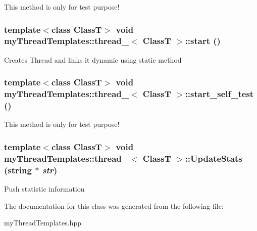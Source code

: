 This method is only for test purpose! 

\hypertarget{classmyThreadTemplates_1_1thread__1_a40dcf528dbb18b16ed44054451a575e1}{
\subsubsection[{start}]{\setlength{\rightskip}{0pt plus 5cm}template$<$class ClassT$>$ void {\bf myThreadTemplates::thread\_}$<$ ClassT $>$::start ()}}
\label{classmyThreadTemplates_1_1thread__1_a40dcf528dbb18b16ed44054451a575e1}


Creates Thread and links it dynamic using static method 

\hypertarget{classmyThreadTemplates_1_1thread__1_aaa171242d5355f2a472a566d30863894}{
\subsubsection[{start\_\-self\_\-test}]{\setlength{\rightskip}{0pt plus 5cm}template$<$class ClassT$>$ void {\bf myThreadTemplates::thread\_}$<$ ClassT $>$::start\_\-self\_\-test ()}}
\label{classmyThreadTemplates_1_1thread__1_aaa171242d5355f2a472a566d30863894}


This method is only for test purpose! 

\hypertarget{classmyThreadTemplates_1_1thread__1_a2cd2286a9d51537395123832a6a25ebc}{
\subsubsection[{UpdateStats}]{\setlength{\rightskip}{0pt plus 5cm}template$<$class ClassT$>$ void {\bf myThreadTemplates::thread\_}$<$ ClassT $>$::UpdateStats (string $\ast$ {\em str})}}
\label{classmyThreadTemplates_1_1thread__1_a2cd2286a9d51537395123832a6a25ebc}


Push statistic information 



The documentation for this class was generated from the following file:\begin{DoxyCompactItemize}
\item 
myThreadTemplates.hpp\end{DoxyCompactItemize}
